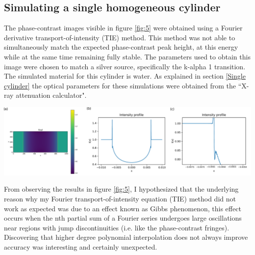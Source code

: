\documentclass[10pt, a4paper, singlespacing]{report}
\newenvironment{Figure}
    {\par\medskip\noindent\minipage{\linewidth}}
    {\endminipage\par\medskip}
\begin{document}
\subsection{Simulating a single homogeneous cylinder}\label{cylinder}
The phase-contrast images visible in figure \ref{fig:5} were obtained using a Fourier derivative transport-of-intensity (TIE) method. This method was not able to simultaneously match the expected phase-contrast peak height, at this energy while at the same time remaining fully stable. The parameters used to obtain this image were chosen to match a silver source, specifically the k-alpha 1 transition. The simulated material for this cylinder is water. As explained in section \ref{Single cylinder} the optical parameters for these simulations were obtained from the ``X-ray attenuation calculator".
\begin{Figure}
\centering
\includegraphics[width=\linewidth]{Fourier_intensity_profile.pdf}
\label{fig:5}
\end{Figure}
From observing the results in figure \ref{fig:5}, I hypothesized that the underlying reason why my Fourier transport-of-intensity equation (TIE) method did not work as expected was due to an effect known as Gibbs phenomenon, this effect occurs when the nth partial sum of a Fourier series undergoes large oscillations near regions with jump discontinuities\cite{Gibbs} (i.e. like the phase-contrast fringes). Discovering that higher degree polynomial interpolation does not always improve accuracy was interesting and certainly unexpected.
\end{document}
